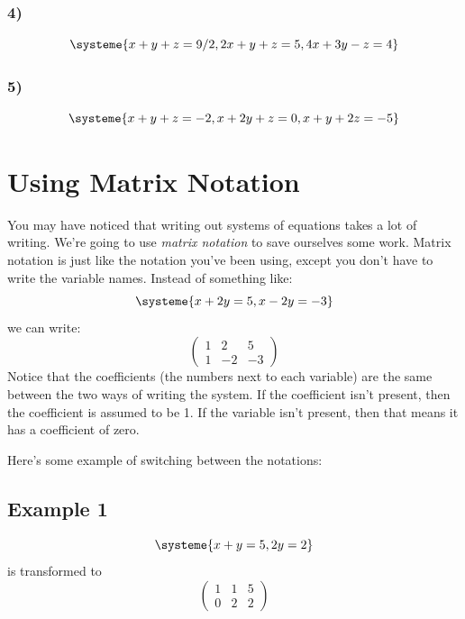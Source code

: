 \documentclass[a4paper,twoside,12pt]{memoir}  %
\begin{document}
\subsubsection{4)}
\begin{equation*}
  \systeme{ %
     x +  y + z = 9/2,
    2x +  y + z = 5,
    4x + 3y - z = 4
  }
\end{equation*}

\subsubsection{5)}
\begin{equation*}
  \systeme{ %
     x +  y + z = -2,
     x + 2y + z = 0,
     x +  y + 2z = -5
  }
\end{equation*}

\section{Using Matrix Notation}
You may have noticed that writing out systems of equations takes a lot of writing.
We're going to use \textit{matrix notation} to save ourselves some work.
Matrix notation is just like the notation you've been using, except you don't have to write the variable names.
Instead of something like:
\begin{equation*}
  \systeme{ %
    x + 2y = 5,
    x - 2y = -3 
  }
\end{equation*}
we can write:
\begin{equation*}
\begin{pmatrix}
  1 &  2 & 5 \\
  1 & -2 & -3
\end{pmatrix}
\end{equation*}
Notice that the coefficients (the numbers next to each variable) are the same between the two ways of writing the system.
If the coefficient isn't present, then the coefficient is assumed to be 1.
If the variable isn't present, then that means it has a coefficient of zero.

Here's some example of switching between the notations:
\subsection{Example 1}
\begin{equation*}
  \systeme{
    x + y = 5,
       2y = 2
  }
\end{equation*}
is transformed to
\begin{equation*}
\begin{pmatrix}
  1 & 1 & 5 \\
  0 & 2 & 2
\end{pmatrix}
\end{equation*}
\end{document}
